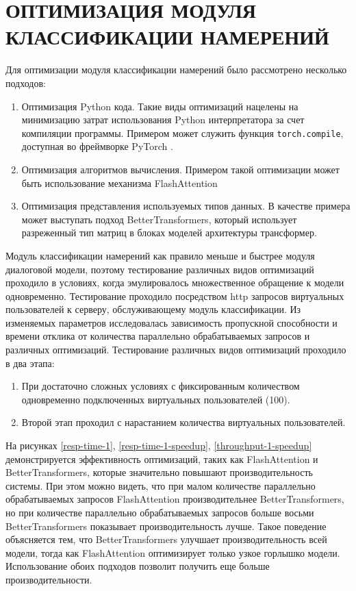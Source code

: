 \section{ОПТИМИЗАЦИЯ МОДУЛЯ КЛАССИФИКАЦИИ НАМЕРЕНИЙ}
Для оптимизации модуля классификации намерений было рассмотрено несколько подходов:
\begin{enumerate}
    \item Оптимизация Python кода. Такие виды оптимизаций нацелены на минимизацию затрат использования Python интерпретатора за счет компиляции программы. Примером может служить функция \texttt{torch.compile}, доступная во фреймворке PyTorch \cite{pt-docs}.
    \item Оптимизация алгоритмов вычисления. Примером такой оптимизации может быть использование механизма FlashAttention
    \item Оптимизация представления используемых типов данных. В качестве примера может выступать подход BetterTransformers, который использует разреженный тип матриц в блоках моделей архитектуры трансформер.
\end{enumerate}

Модуль классификации намерений как правило меньше и быстрее модуля диалоговой модели, поэтому тестирование различных видов оптимизаций проходило в условиях, когда эмулировалось множественное обращение к модели одновременно. Тестирование проходило посредством http запросов виртуальных пользователей к серверу, обслуживающему модуль классификации. Из изменяемых параметров исследовалась зависимость пропускной способности и времени отклика от количества параллельно обрабатываемых запросов и различных оптимизаций. Тестирование различных видов оптимизаций проходило в два этапа:
\begin{enumerate}
    \item При достаточно сложных условиях с фиксированным количеством одновременно подключенных виртуальных пользователей (100).
    \item Второй этап проходил с нарастанием количества виртуальных пользователей.
\end{enumerate}

На рисунках \ref{resp-time-1}, \ref{resp-time-1-speedup}, \ref{throughput-1-speedup} демонстрируется эффективность оптимизаций, таких как FlashAttention и BetterTransformers, которые значительно повышают производительность системы. При этом можно видеть, что при малом количестве параллельно обрабатываемых запросов FlashAttention производительнее BetterTransformers, но при количестве параллельно обрабатываемых запросов больше восьми BetterTransformers показывает производительность лучше. Такое поведение объясняется тем, что BetterTransformers улучшает производительность всей модели, тогда как FlashAttention оптимизирует только узкое горлышко модели. Использование обоих подходов позволит получить еще больше производительности.

